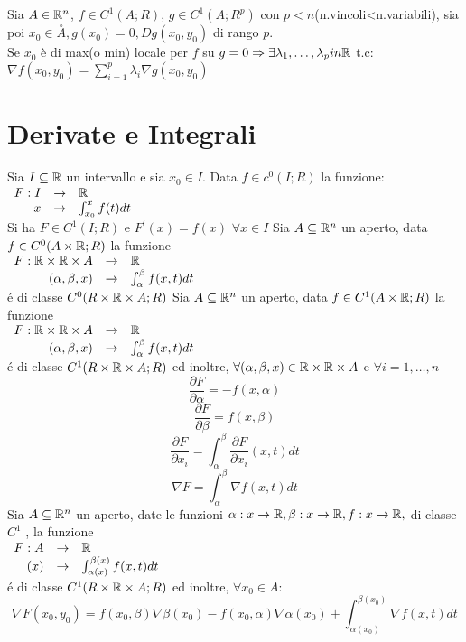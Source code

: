 Sia $A\in \mathbb{R}^n$, $f\in C^1(A;R)$, $g\in C^1(A;R^p)$ con $p<n$(n.vincoli<n.variabili), sia poi $x_0\in\overset{\circ}{A}, g(x_0)=0, Dg (x_0,y_0)$ di rango $p$.\\
Se $x_0$ è di max(o min) locale per $f$ su $g=0\Rightarrow\exists \lambda_1,\ldots,\lambda_p in \mathbb{R}$ t.c: $\nabla f(x_0,y_0) = \sum\limits_{i=1}^{p}\lambda_i\nabla g(x_0,y_0)$\\
\section{Derivate e Integrali}
Sia $I\subseteq \mathbb{R}$ un intervallo e sia $x_0\in I$. Data $f\in c^0(I;R)$ la funzione:\\
$\begin{array}{rcl} F: I & \to & \mathbb{R} \\ x & \to & \int_{x_0}^{x}f(t)dt \end{array}$\\
Si ha $F\in C^1(I;R)$ e $F^{'}(x)=f(x)$ $\forall x \in I$
\proposition
Sia $A\subseteq \mathbb{R}^n$ un aperto, data $f\in C^0(A\times \mathbb{R};R)$ la funzione \\
$\begin{array}{rcl} F: \mathbb{R}\times \mathbb{R}\times A & \to & \mathbb{R} \\ (\alpha,\beta,x) & \to & \int_{\alpha}^{\beta}f(x,t)dt \end{array}$\\
\'e di classe $C^0(R\times \mathbb{R}\times A;R)$
\proposition
Sia $A\subseteq \mathbb{R}^n$ un aperto, data $f\in C^1(A\times \mathbb{R};R)$ la funzione \\
$\begin{array}{rcl} F: \mathbb{R}\times \mathbb{R}\times A & \to & \mathbb{R} \\ (\alpha,\beta,x) & \to & \int_{\alpha}^{\beta}f(x,t)dt \end{array}$\\
\'e di classe $C^1(R\times \mathbb{R}\times A;R)$ ed inoltre, $\forall (\alpha,\beta,x)\in \mathbb{R}\times \mathbb{R}\times A$ e $\forall i=1,\ldots,n$\\
$$\frac{\partial F}{\partial \alpha}=-f(x,\alpha)$$
$$\frac{\partial F}{\partial \beta}=f(x,\beta)$$
$$\frac{\partial F}{\partial x_i}=\int_{\alpha}^{\beta}\frac{\partial F}{\partial x_i}(x,t)dt$$
$$\nabla F=\int_{\alpha}^{\beta}\nabla f(x,t)dt$$
\corollary
Sia $A\subseteq \mathbb{R}^n$ un aperto, date le funzioni $\alpha:x\rightarrow \mathbb{R}, \beta:x\rightarrow \mathbb{R}, f:x\rightarrow \mathbb{R}, $ di classe $C^1$ , la funzione \\
$\begin{array}{rcl} F: A & \to & \mathbb{R} \\ (x) & \to & \int_{\alpha(x)}^{\beta(x)}f(x,t)dt \end{array}$\\
\'e di classe $C^1(R\times \mathbb{R}\times A;R)$ ed inoltre, $\forall x_0 \in A$:
$$\nabla F(x_0,y_0)=f(x_0,\beta)\nabla\beta(x_0)-f(x_0,\alpha)\nabla\alpha(x_0)+\int_{\alpha(x_0)}^{\beta(x_0)}\nabla f(x,t)dt$$


